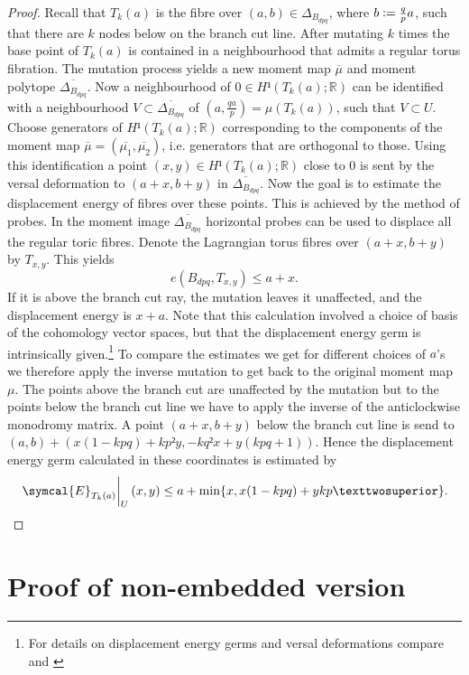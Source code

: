 \documentclass[12pt,a4paper,draft]{scrartcl}
\begin{document}
\begin{proof}
    Recall that $T_k(a)$ is the fibre over $(a,b) \in Δ_{B_{dpq}}$, where $b\vcentcolon=\frac{q}{p}a$, such that there are $k$ nodes below on the branch cut line. After mutating $k$ times the base point of $T_k(a)$ is contained in a neighbourhood that admits a regular torus fibration. The mutation process yields a new moment map $\overline{μ}$ and moment polytope $\overline{Δ_{B_{dpq}}}$.  Now a neighbourhood of $0 ∈ H¹(T_k(a);ℝ)$ can be identified with a neighbourhood $V ⊂ \overline{Δ_{B_{dpq}}}$ of $(a,\frac{qa}{p}) = μ(T_k(a))$, such that $V \subset U$. Choose generators of $H¹(T_k(a);ℝ)$ corresponding to the components of the moment map $\overline{\mu}=(\overline{\mu_1},\overline{\mu_2})$, i.e. generators that are orthogonal to those. Using this identification a point $(x,y) ∈ H¹(T_k(a);ℝ)$ close to $0$ is sent by the versal deformation to $(a + x, b + y)$ in $\overline{Δ_{B_{dpq}}}$. Now the goal is to estimate the displacement energy of fibres over these points. This is achieved by the method of probes. In the moment image $\overline{Δ_{B_{dpq}}}$ horizontal probes can be used to displace all the regular toric fibres. Denote the Lagrangian torus fibres over $(a + x, b + y)$ by $T_{x,y}$. This yields 
    \[ e(B_{dpq},T_{x,y})\leq a+x. \]
    If it is above the branch cut ray,  the mutation leaves it unaffected, and the displacement energy is $x+a$. Note that this calculation involved a choice of basis of the cohomology vector spaces, but that the displacement energy germ is intrinsically given.\footnote{For details on displacement energy germs and versal deformations compare \cite{chekanovschlenk2015} and \cite{brendel2020real}} To compare the estimates we get for different choices of $a$'s we therefore apply the inverse mutation to get back to the original moment map $\mu$. The points above the branch cut are unaffected by the mutation but to the points below the branch cut line we have to apply the inverse of the anticlockwise monodromy matrix. A point $(a + x, b + y)$ below the branch cut line is send to $(a,b) + (x(1-kpq)+kp²y, -kq²x + y(kpq +1))$. Hence the displacement energy germ calculated in these coordinates is estimated by 
    \[ \eval{\symcal{E}_{T_k(a)}}_U (x,y) \leq a+\min\{x,x(1-kpq)+ykp²\}. \]
\end{proof}


\section{Proof of non-embedded version}
\end{document}
